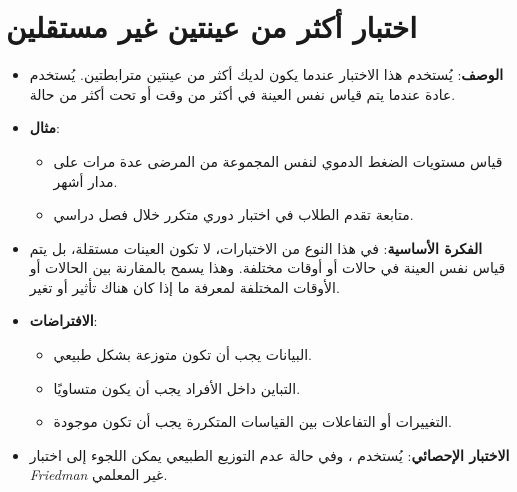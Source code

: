 	\section{اختبار أكثر من عينتين غير مستقلين }
	\begin{itemize}
		\item \textbf{الوصف}: يُستخدم هذا الاختبار عندما يكون لديك أكثر من عينتين مترابطتين. يُستخدم عادة عندما يتم قياس نفس العينة في أكثر من وقت أو تحت أكثر من حالة.
		\item \textbf{مثال}:
		\begin{itemize}
			\item قياس مستويات الضغط الدموي لنفس المجموعة من المرضى عدة مرات على مدار أشهر.
			\item متابعة تقدم الطلاب في اختبار دوري متكرر خلال فصل دراسي.
		\end{itemize}
		\item \textbf{الفكرة الأساسية}: في هذا النوع من الاختبارات، لا تكون العينات مستقلة، بل يتم قياس نفس العينة في حالات أو أوقات مختلفة. وهذا يسمح بالمقارنة بين الحالات أو الأوقات المختلفة لمعرفة ما إذا كان هناك تأثير أو تغير.
		\item \textbf{الافتراضات}:
		\begin{itemize}
			\item البيانات يجب أن تكون متوزعة بشكل طبيعي.
			\item التباين داخل الأفراد يجب أن يكون متساويًا.
			\item التغييرات أو التفاعلات بين القياسات المتكررة يجب أن تكون موجودة.
		\end{itemize}
		\item \textbf{الاختبار الإحصائي}: يُستخدم \textit{}، وفي حالة عدم التوزيع الطبيعي يمكن اللجوء إلى اختبار \textit{Friedman} غير المعلمي.
	\end{itemize}

	





